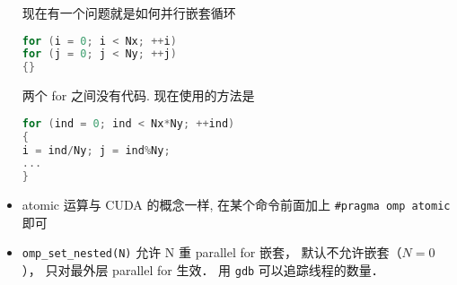 \begin{itemize}
现在有一个问题就是如何并行嵌套循环
\begin{lstlisting}[language=cpp]
for (i = 0; i < Nx; ++i)
for (j = 0; j < Ny; ++j)
{}
\end{lstlisting}
两个 for 之间没有代码. 现在使用的方法是
\begin{lstlisting}[language=cpp]
for (ind = 0; ind < Nx*Ny; ++ind)
{
i = ind/Ny; j = ind%Ny;
...
}
\end{lstlisting}
\item atomic 运算与 CUDA 的概念一样, 在某个命令前面加上 \verb|#pragma omp atomic| 即可
\item \verb|omp_set_nested(N)| 允许 N 重 parallel for 嵌套， 默认不允许嵌套（$N=0$）， 只对最外层 parallel for 生效． 用 \verb|gdb| 可以追踪线程的数量．
\end{itemize}
